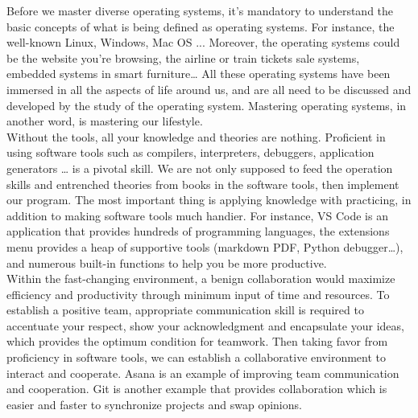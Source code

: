 \documentclass[a4paper, 11pt]{report}
\begin{document}
\noindent Before we master diverse operating systems, it’s mandatory to understand the basic concepts of what is being defined as operating systems. For instance, the well-known Linux, Windows, Mac OS ... Moreover, the operating systems could be the website you’re browsing, the airline or train tickets sale systems, embedded systems in smart furniture… All these operating systems have been immersed in all the aspects of life around us, and are all need to be discussed and developed by the study of the operating system. Mastering operating systems, in another word, is mastering our lifestyle.\\

\noindent Without the tools, all your knowledge and theories are nothing. Proficient in using software tools such as compilers, interpreters, debuggers, application generators … is a pivotal skill. We are not only supposed to feed the operation skills and entrenched theories from books in the software tools, then implement our program. The most important thing is applying knowledge with practicing, in addition to making software tools much handier. For instance, VS Code is an application that provides hundreds of programming languages, the extensions menu provides a heap of supportive tools (markdown PDF, Python debugger…), and numerous built-in functions to help you be more productive.\\

\noindent Within the fast-changing environment, a benign collaboration would maximize efficiency and productivity through minimum input of time and resources. To establish a positive team, appropriate communication skill is required to accentuate your respect, show your acknowledgment and encapsulate your ideas, which provides the optimum condition for teamwork. Then taking favor from proficiency in software tools, we can establish a collaborative environment to interact and cooperate. Asana is an example of improving team communication and cooperation. Git is another example that provides collaboration which is easier and faster to synchronize projects and swap opinions.\\
\end{document}
